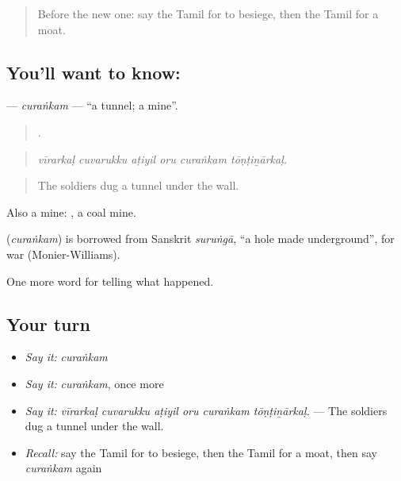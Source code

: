 \label{lesson:TA-C335-curankam}



\begin{quote}
Before the new one: say the Tamil for to besiege, then the Tamil for a moat.
\end{quote}

\subsection*{You'll want to know: }
\textbf{} — \emph{curaṅkam} — \textquotedblleft{}a tunnel; a mine\textquotedblright{}.

\begin{quote}
     .
\end{quote}

\begin{quote}
\emph{vīrarkaḷ cuvarukku aṭiyil oru curaṅkam tōṇṭiṉārkaḷ.}
\end{quote}

\begin{quote}
The soldiers dug a tunnel under the wall.
\end{quote}

Also a mine:  , a coal mine.

\begin{cousinweb}
\textbf{} (\emph{curaṅkam}) is borrowed from Sanskrit \emph{suruṅgā}, \textquotedblleft{}a hole made underground\textquotedblright{}, for war (Monier-Williams).
\end{cousinweb}

\begin{grammarlens}[title={What you've built}]
One more word for telling what happened.
\end{grammarlens}

\subsection*{Your turn}
\begin{itemize}
\raggedright
  \item \emph{Say it:} \emph{curaṅkam}
  \item \emph{Say it:} \emph{curaṅkam}, once more
  \item \emph{Say it:} \emph{vīrarkaḷ cuvarukku aṭiyil oru curaṅkam tōṇṭiṉārkaḷ.} — The soldiers dug a tunnel under the wall.
  \item \emph{Recall:} say the Tamil for to besiege, then the Tamil for a moat, then say \emph{curaṅkam} again
\end{itemize}

